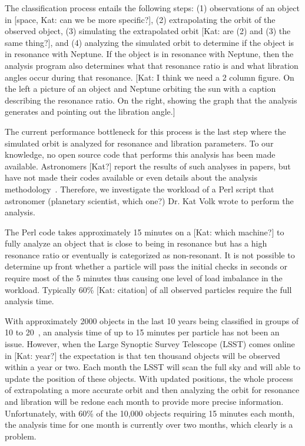 \documentclass[conference]{IEEEtran}
\begin{document}
The classification process entails the following steps:
(1) observations of an object in [space, Kat: can we be more specific?],
(2) extrapolating the orbit of the observed object,
(3) simulating the extrapolated orbit [Kat: are (2) and (3) the
same thing?],
and
(4) analyzing the simulated orbit to determine if the object is
in resonance with Neptune.
If the object is in resonance with Neptune, then the analysis
program also determines what that resonance ratio is
and what libration angles occur during that resonance.
[Kat: I think we need a 2 column figure.  On the left a picture of 
an object and Neptune orbiting the sun with a caption describing
the resonance ratio.  On the right, showing the graph that the 
analysis generates and pointing out the libration angle.]

The current performance bottleneck for this process is the
last step where the simulated orbit is analyzed for resonance
and libration parameters.
To our knowledge, no open source code that performs this
analysis has been made available.  Astronomers [Kat?] report
the results of such analyses in papers, but have not made their
codes available or even details about the analysis 
methodology~\cite{AnalysisResultsCitations}.
Therefore, we investigate the workload of a Perl script
that astronomer (planetary scientist, which one?) 
Dr. Kat Volk wrote to perform the analysis.

The Perl code takes approximately 15 minutes on a [Kat: which machine?]
to fully analyze an object that is close to being in resonance but has a high
resonance ratio or eventually is categorized as non-resonant.
It is not possible to determine up front whether a particle will pass
the initial checks in seconds or require most of the 5 minutes
thus causing one level of load imbalance in the workload.
Typically 60\% [Kat: citation] of all observed particles require
the full analysis time.

With approximately
2000 objects in the last 10 years being classified in
groups of 10 to 20~\cite{ClassificationCite}, an analysis time
of up to 15 minutes per particle has not been an issue.
However, when the Large Synoptic Survey Telescope (LSST) comes 
online in  [Kat: year?] the expectation is that ten thousand objects
will be observed within a year or two.
Each month the LSST will scan the full sky and will able to update
the position of these objects.  With updated positions, the 
whole process of extrapolating a more accurate orbit and then 
analyzing the orbit for resonance and libration will be redone
each month to provide more precise information.
Unfortunately, with 60\% of the 10,000 objects requiring 15 minutes
each month, the analysis time for one month is currently over two months,
which clearly is a problem.
\end{document}
